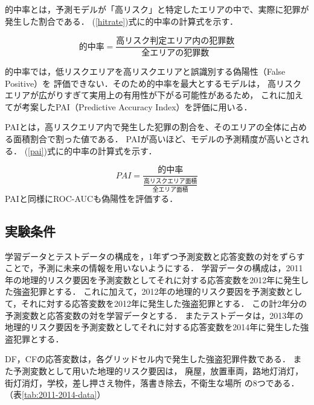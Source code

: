 的中率とは，予測モデルが「高リスク」と特定したエリアの中で、実際に犯罪が発生した割合である．
(\ref{hitrate})式に的中率の計算式を示す．

\begin{equation}\label{hitrate}
  的中率=\frac{高リスク判定エリア内の犯罪数}{全エリアの犯罪数}
\end{equation}

的中率では，低リスクエリアを高リスクエリアと誤識別する偽陽性（False Positive）を
評価できない．そのため的中率を最大とするモデルは，
高リスクエリアが広がりすぎて実用上の有用性が下がる可能性があるため，
これに加えて\cite{chainey2008utility}が考案したPAI（Predictive Accuracy Index）を評価に用いる．

PAIとは，高リスクエリア内で発生した犯罪の割合を、そのエリアの全体に占める面積割合で割った値である．
PAIが高いほど、モデルの予測精度が高いとされる．
(\ref{pai})式に的中率の計算式を示す．

\begin{equation}\label{pai}
  PAI=\frac{的中率}{\frac{高リスクエリア面積}{全エリア面積}}
\end{equation}
PAIと同様にROC-AUCも偽陽性を評価する．

\subsection{実験条件}
学習データとテストデータの構成を，1年ずつ予測変数と応答変数の対をずらすことで，予測に未来の情報を用いないようにする．
学習データの構成は，2011年の地理的リスク要因を予測変数としてそれに対する応答変数を2012年に発生した強盗犯罪とする．
これに加えて，2012年の地理的リスク要因を予測変数として，それに対する応答変数を2012年に発生した強盗犯罪とする．
この計2年分の予測変数と応答変数の対を学習データとする．
またテストデータは，2013年の地理的リスク要因を予測変数としてそれに対する応答変数を2014年に発生した強盗犯罪とする．

DF，CFの応答変数は，各グリッドセル内で発生した強盗犯罪件数である．
また予測変数として用いた地理的リスク要因は，
廃屋，放置車両，路地灯消灯，街灯消灯，学校，差し押さえ物件，落書き除去，不衛生な場所
の8つである．（表\ref{tab:2011-2014-data}）


